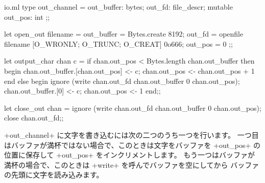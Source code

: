 \begin{myimage}[width="85\%"]
\end{myimage}
%
\begin{listingcodefile}{io.ml}
type out_channel =
  { out_buffer: bytes;
    out_fd: file_descr;
    mutable out_pos: int };;

let open_out filename =
  { out_buffer = Bytes.create 8192;
    out_fd = openfile filename [O_WRONLY; O_TRUNC; O_CREAT] 0o666;
    out_pos = 0 };;

let output_char chan c =
  if chan.out_pos < Bytes.length chan.out_buffer then begin
    chan.out_buffer.[chan.out_pos] <- c;
    chan.out_pos <- chan.out_pos + 1
  end else begin
    ignore (write chan.out_fd chan.out_buffer 0 chan.out_pos);
    chan.out_buffer.[0] <- c;
    chan.out_pos <- 1
  end;;

let close_out chan =
  ignore (write chan.out_fd chan.out_buffer 0 chan.out_pos);
  close chan.out_fd;;
\end{listingcodefile}
%
\ml+out_channel+ に文字を書き込むには次の二つのうち一つを行います。
一つ目はバッファが満杯ではない場合で、このときは文字をバッファを \ml+out_pos+ の位置に保存して
\ml+out_pos+ をインクリメントします。
もう一つはバッファが満杯の場合で、このときは \ml+write+ を呼んでバッファを空にしてから
バッファの先頭に文字を読み込みます。

